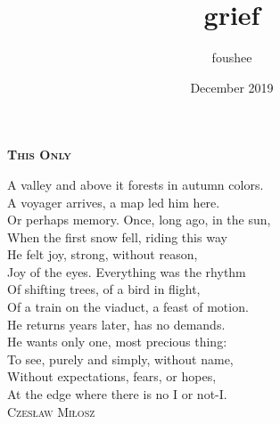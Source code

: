 \documentclass[14pt]{memoir}
\title{grief}
\author{foushee }
\date{December 2019}
\begin{document}
\thispagestyle{empty}
\textbf{\textsc{\large This Only}}
\vspace{38pt}

A valley and above it forests in autumn colors.\\
A voyager arrives, a map led him here.\\
Or perhaps memory. Once, long ago, in the sun,\\
When the first snow fell, riding this way\\
He felt joy, strong, without reason,\\
Joy of the eyes. Everything was the rhythm\\
Of shifting trees, of a bird in flight,\\
Of a train on the viaduct, a feast of motion.\\
He returns years later, has no demands.\\
He wants only one, most precious thing:\\
To see, purely and simply, without name,\\
Without expectations, fears, or hopes,\\
At the edge where there is no I or not-I.\\

\vspace{24pt}
\hspace{94pt} \textsc{Czesław Miłosz}\\
\vfill
\end{document}
